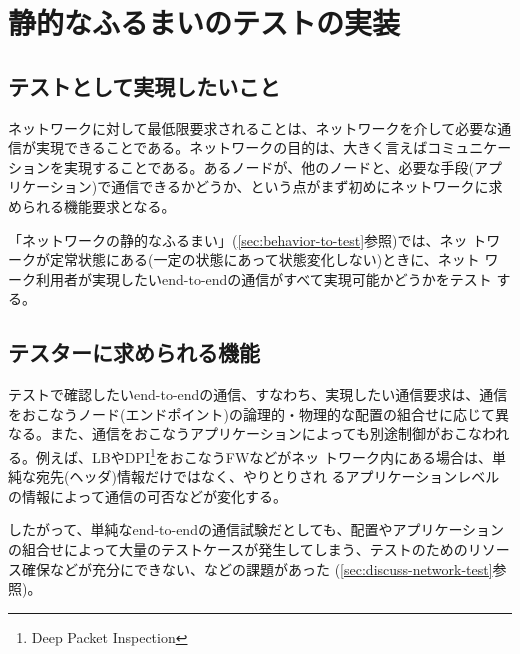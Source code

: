 
 \section{静的なふるまいのテストの実装}

  \subsection{テストとして実現したいこと}
ネットワークに対して最低限要求されることは、ネットワークを介して必要な通
信が実現できることである。ネットワークの目的は、大きく言えばコミュニケー
ションを実現することである。あるノードが、他のノードと、必要な手段(アプ
リケーション)で通信できるかどうか、という点がまず初めにネットワークに求
められる機能要求となる。

「ネットワークの静的なふるまい」(\ref{sec:behavior-to-test}参照)では、ネッ
トワークが定常状態にある(一定の状態にあって状態変化しない)ときに、ネット
ワーク利用者が実現したいend-to-endの通信がすべて実現可能かどうかをテスト
する。

  \subsection{テスターに求められる機能}

テストで確認したいend-to-endの通信、すなわち、実現したい通信要求は、通信
をおこなうノード(エンドポイント)の論理的・物理的な配置の組合せに応じて異
なる。また、通信をおこなうアプリケーションによっても別途制御がおこなわれ
る。例えば、LBやDPI\footnote{Deep Packet Inspection}をおこなうFWなどがネッ
トワーク内にある場合は、単純な宛先(ヘッダ)情報だけではなく、やりとりされ
るアプリケーションレベルの情報によって通信の可否などが変化する。

したがって、単純なend-to-endの通信試験だとしても、配置やアプリケーション
の組合せによって大量のテストケースが発生してしまう、テストのためのリソー
ス確保などが充分にできない、などの課題があった
(\ref{sec:discuss-network-test}参照)。

